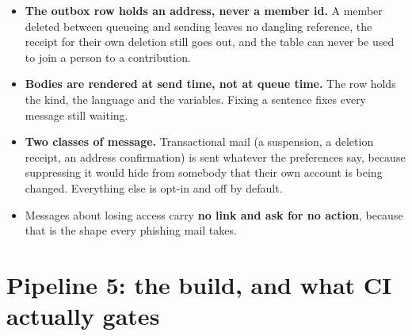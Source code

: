 \documentclass[11pt,a4paper]{article}
\begin{document}
\begin{center}
\end{center}

\begin{itemize}[leftmargin=*]
  \item \textbf{The outbox row holds an address, never a member id.} A member
        deleted between queueing and sending leaves no dangling reference, the
        receipt for their own deletion still goes out, and the table can never
        be used to join a person to a contribution.
  \item \textbf{Bodies are rendered at send time, not at queue time.} The row
        holds the kind, the language and the variables. Fixing a sentence fixes
        every message still waiting.
  \item \textbf{Two classes of message.} Transactional mail (a suspension, a
        deletion receipt, an address confirmation) is sent whatever the
        preferences say, because suppressing it would hide from somebody that
        their own account is being changed. Everything else is opt-in and off
        by default.
  \item Messages about losing access carry \textbf{no link and ask for no
        action}, because that is the shape every phishing mail takes.
\end{itemize}


\section{Pipeline 5: the build, and what CI actually gates}
\end{document}
